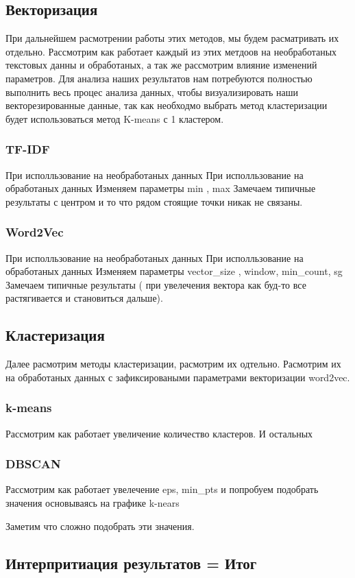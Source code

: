 	\subsection{Векторизация}
		При дальнейшем расмотрении работы этих методов, мы будем расматривать их отдельно. Рассмотрим как работает каждый из этих метдоов на необработаных текстовых данны и обработаных, а так же рассмотрим влияние изменений параметров. Для анализа наших результатов нам потребуются полностью выполнить весь процес анализа данных, чтобы визуализировать наши векторезированные данные, так как необходмо выбрать метод кластеризации будет использоваться метод K-means с 1 кластером.
	
		\subsubsection{TF-IDF}
			При исполльзование на необработаных данных
			При исполльзование на обработаных данных
			Изменяем параметры min , max
			Замечаем типичные результаты с центром и то что рядом стоящие точки никак не связаны.
			
		\subsubsection{Word2Vec}
		 	При исполльзование на необработаных данных
		 	При исполльзование на обработаных данных
		 	Изменяем параметры vector\_size , window, min\_count, sg
		 	Замечаем типичные результаты ( при увелечения вектора как буд-то все растягивается и становиться дальше). 
	
	
	\subsection{Кластеризация}
		Далее расмотрим методы кластеризации, расмотрим их одтельно. Расмотрим их на обработаных данных с зафиксироваными параметрами векторизации word2vec. 
		
		\subsubsection{k-means}
			Рассмотрим как работает увеличение количество кластеров. И остальных
		
		\subsubsection{DBSCAN}
			Рассмотрим как работает увелечение eps, min\_pts и попробуем подобрать значения основываясь на графике k-nears
			
			Заметим что сложно подобрать эти значения.
	
	\subsection{Интерпритиация результатов = Итог}
		
		
		

